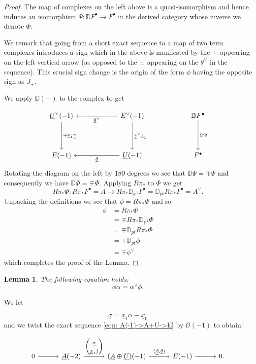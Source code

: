 \documentclass{amsart}
\newtheorem{lemma}[theorem]{Lemma}
\theoremstyle{definition}
\newcommand{\DD} {{\mathbb D}}
\newcommand{\PP}{\mathbb{P}}
\newcommand{\OO}{\mathcal{O}}
\newcommand{\UL}[1]{\underline{#1}}
\newcommand{\Rpistar}{R\pi_{*}}
\begin{document}
\begin{proof}
The map of complexes on the left above is a quasi-isomorphism and
hence induces an isomorphism $\Psi :\DD F^{\bullet}\to F^{\bullet}$
in the derived category whose inverse we denote $\Phi$.

We remark that going from a short exact sequence to a map of two term
complexes introduces a sign which in the above is manifested by the
$\mp$ appearing on the left vertical arrow (as opposed to the $\pm$
appearing on the $\UL{\theta}^{\vee}$ in the sequence). This crucial
sign change is the origin of the form $\phi$ having the opposite sign
as $J_{\pm}$.

We apply $\DD (-)$ to the complex to get

\[
\begin{tikzcd}[column sep=6em,row sep=4em]
  \UL{U}^{\vee }(-1)
    \arrow[d,"\mp\UL{x}_{1} \UL{\gamma}"]
  & E^{\vee}(-1)
    \arrow[d,"\UL{\gamma }^{\vee } \UL{x}_{1}"]
    \arrow[l,"\UL{\theta }^{\vee}"]
  & \DD F^{\bullet}
    \arrow[d,"\DD \Psi  "]
  \\
  E(-1)
  & \UL{U}(-1)
    \arrow[l,"\UL{\theta }"]
  & F^{\bullet}
\end{tikzcd}
\]
Rotating the diagram on the left by 180 degrees we see that $\DD \Psi
=\mp \Psi$ and consequently we have $\DD \Phi =\mp \Phi$. Applying
$\Rpistar $ to $\Phi$ we get
\[
\Rpistar \Phi : \Rpistar F^{\bullet} = A \to \Rpistar
\DD_{\PP^{1}}F^{\bullet}=\DD_{pt}\Rpistar F^{\bullet} = A^{\vee}.
\]
Unpacking the definitions we see that $\phi  = \Rpistar \Phi$ and so
\begin{align*}
\phi &=\Rpistar \Phi \\
&=\mp \Rpistar \DD_{\PP^{1}}\Phi \\
&=\mp \DD_{pt}\Rpistar \Phi \\
&=\mp \DD_{pt}\phi \\
&=\mp \phi^{\vee}
\end{align*}
which completes the proof of the Lemma.
\end{proof}
 
  
\begin{lemma}\label{lem: phi.alpha=alphavee.phi} The following
equation holds:
\[
\phi \alpha =\alpha^{\vee}\phi .
\]
\end{lemma}

\proof We let

\[
\UL{\sigma} = \UL{x}_{1}\alpha -\UL{x}_{0}
\]
and we twist the exact sequence \eqref{eqn: A(-1)->A+U->E} by $\OO
(-1)$ to obtain:

\[
\begin{tikzcd}[column sep=3em]
  0
    \arrow[r]
  & \UL{A}(-2)
    \arrow[r,"{%
      \begin{pmatrix}
        \UL{\sigma } \\
        \UL{x}_{1}j
      \end{pmatrix}
    }"]
  & (\UL{A}\oplus \UL{U})(-1)
    \arrow[r,"{(\UL{\beta},\UL{\theta})}"]
  & E(-1)
    \arrow[r]
  & 0.
\end{tikzcd}
\]
\end{document}
